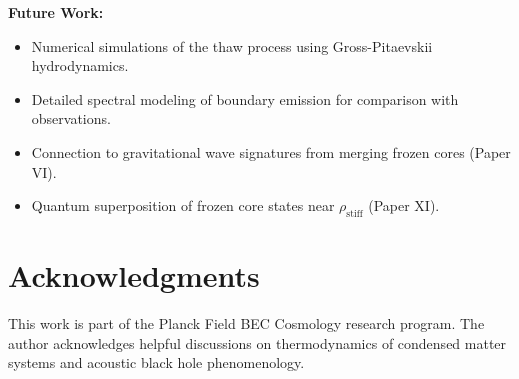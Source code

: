 \documentclass[11pt,a4paper]{article}
\newcommand{\rhostiff}{\ensuremath{\rho_{\mathrm{stiff}}}}
\theoremstyle{definition}
\theoremstyle{remark}
\begin{document}
\vspace{0.5em}
\noindent
\textbf{Future Work:}
\begin{itemize}[leftmargin=*, itemsep=0.3em]
\item Numerical simulations of the thaw process using Gross-Pitaevskii hydrodynamics.
\item Detailed spectral modeling of boundary emission for comparison with observations.
\item Connection to gravitational wave signatures from merging frozen cores (Paper VI).
\item Quantum superposition of frozen core states near $\rhostiff$ (Paper XI).
\end{itemize}

\section*{Acknowledgments}

This work is part of the Planck Field BEC Cosmology research program. The author acknowledges helpful discussions on thermodynamics of condensed matter systems and acoustic black hole phenomenology.
\end{document}
